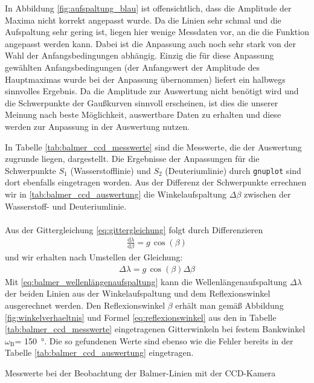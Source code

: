 \documentclass[11pt, a4paper]{article}
\numberwithin{equation}{section}
\begin{document}
\FloatBarrier
In Abbildung \ref{fig:aufspaltung_blau} ist offensichtlich, dass die Amplitude der Maxima nicht korrekt angepasst wurde.
Da die Linien sehr schmal und die Aufspaltung sehr gering ist, liegen hier wenige Messdaten vor, an die die Funktion angepasst werden kann.
Dabei ist die Anpassung auch noch sehr stark von der Wahl der Anfangsbedingungen abhängig.
Einzig die für diese Anpassung gewählten Anfangsbedingungen (der Anfangswert der Amplitude des Hauptmaximas wurde bei der Anpassung übernommen) liefert ein halbwegs sinnvolles Ergebnis.
Da die Amplitude zur Auswertung nicht benötigt wird und die Schwerpunkte der Gaußkurven sinnvoll erscheinen, ist dies die unserer Meinung nach beste Möglichkeit, auswertbare Daten zu erhalten und diese werden zur Anpassung in der Auswertung nutzen.

In Tabelle \ref{tab:balmer_ccd_messwerte} sind die Messwerte, die der Auswertung zugrunde liegen, dargestellt.
Die Ergebnisse der Anpassungen für die Schwerpunkte $S_1$ (Wasserstofflinie) und $S_2$ (Deuteriumlinie) durch \texttt{gnuplot} sind dort ebenfalls eingetragen worden.
Aus der Differenz der Schwerpunkte errechnen wir in \ref{tab:balmer_ccd_auswertung} die Winkelaufspaltung $\Delta\beta$ zwischen der Wasserstoff- und Deuteriumlinie.\\
\\
Aus der Gittergleichung \eqref{eq:gittergleichung} folgt durch Differenzieren
\begin{align*}
\frac{\text{d}\lambda}{\text{d}\beta}=g\,\cos(\beta)
\end{align*}
und wir erhalten nach Umstellen der Gleichung:
\begin{align}
\Delta\lambda=g\,\cos(\beta)\Delta\beta
\label{eq:balmer_wellenlängenaufspaltung}
\end{align}
Mit \eqref{eq:balmer_wellenlängenaufspaltung} kann die Wellenlängenaufspaltung $\Delta\lambda$ der beiden Linien aus der Winkelaufspaltung und dem Reflexionswinkel ausgerechnet werden.
Den Reflexionswinkel $\beta$ erhält man gemäß Abbildung \ref{fig:winkelverhaeltnis} und Formel  \eqref{eq:reflexionswinkel} aus den in Tabelle \ref{tab:balmer_ccd_messwerte} eingetragenen Gitterwinkeln bei festem Bankwinkel $\omega_\text{B}$= \SI{150}{\degree}.
Die so gefundenen Werte sind ebenso wie die Fehler bereits in der Tabelle \ref{tab:balmer_ccd_auswertung} eingetragen.
\begin{table}[h]
\centering
\resizebox{\columnwidth}{!}{%
}
\caption{Messwerte bei der Beobachtung der Balmer-Linien mit der CCD-Kamera}
\label{tab:balmer_ccd_messwerte}
\end{table}
\end{document}
